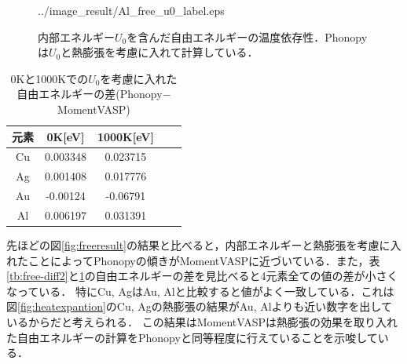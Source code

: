 \begin{figure}[htbp]
\begin{minipage}[b]{0.5\linewidth}
  {../image_result/Al_free_u0_label.eps}
  \label{free8}
 \end{minipage}
 \caption{内部エネルギー$U_0$を含んだ自由エネルギーの温度依存性．Phonopyは$U_0$と熱膨張を考慮に入れて計算している．}\label{fig:freeresult2}
\end{figure}

\begin{table}[htbp]
\caption{0Kと1000Kでの$U_0$を考慮に入れた自由エネルギーの差(Phonopy$-$MomentVASP)}
  \label{tb:free-diff3}
  \centering
  \begin{tabular}{ccccc}\hline
    元素 & 0K[eV] & 1000K[eV] \\ \hline \hline
    Cu & 0.003348 & 0.023715 \\
    Ag & 0.001408 & 0.017776 \\
    Au & -0.00124 & -0.06791 \\
    Al & 0.006197 & 0.031391 \\ \hline
  \end{tabular}
\end{table}

先ほどの図\ref{fig:freeresult}の結果と比べると，内部エネルギーと熱膨張を考慮に入れたことによってPhonopyの傾きがMomentVASPに近づいている．また，表\ref{tb:free-diff2}と\ref{tb:free-diff3}の自由エネルギーの差を見比べると4元素全ての値の差が小さくなっている．
特にCu, AgはAu, Alと比較すると値がよく一致している．これは図\ref{fig:heatexpantion}のCu, Agの熱膨張の結果がAu, Alよりも近い数字を出しているからだと考えられる．
この結果はMomentVASPは熱膨張の効果を取り入れた自由エネルギーの計算をPhonopyと同等程度に行えていることを示唆している．

